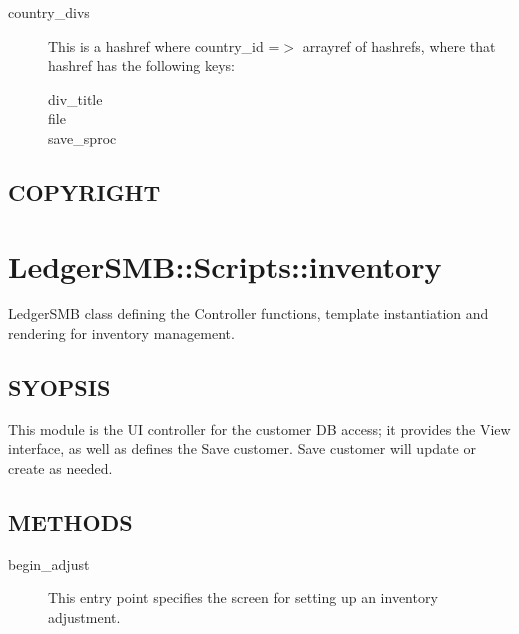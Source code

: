 \begin{description}
\begin{description}
\item[{country\_divs}] \mbox{}

This is a hashref where country\_id =$>$ arrayref of hashrefs, where that hashref 
has the following keys:

\begin{description}

\item[{div\_title}] \mbox{}
\item[{file}] \mbox{}
\item[{save\_sproc}] \mbox{}\end{description}
\end{description}
\subsection*{COPYRIGHT\label{LedgerSMB::Scripts::employee::country_COPYRIGHT}}
\section{LedgerSMB::Scripts::inventory\label{LedgerSMB::Scripts::inventory}}


LedgerSMB class defining the Controller
functions, template instantiation and rendering for inventory management.

\subsection*{SYOPSIS\label{LedgerSMB::Scripts::inventory_SYOPSIS}}


This module is the UI controller for the customer DB access; it provides the 
View interface, as well as defines the Save customer. 
Save customer will update or create as needed.

\subsection*{METHODS\label{LedgerSMB::Scripts::inventory_METHODS}}
\begin{description}

\item[{begin\_adjust}] \mbox{}

This entry point specifies the screen for setting up an inventory adjustment.

\end{description}
\begin{description}


\end{description}
\end{description}

